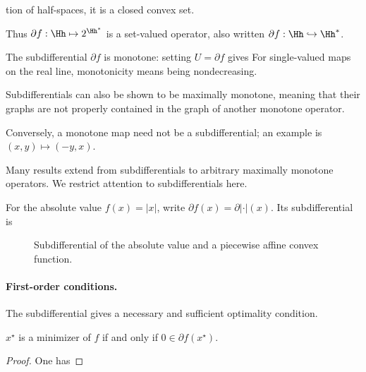 tion of half-spaces, it is a closed convex set.
                                                      
 
Thus $\partial f : \Hh \mapsto 2^{\Hh^*}$ is a set-valued operator, also written $\partial f : \Hh \hookrightarrow \Hh^*$.

\begin{rem}
The subdifferential $\partial f$ is monotone: setting $U=\partial f$ gives
For single-valued maps on the real line, monotonicity means being nondecreasing.
 
Subdifferentials can also be shown to be maximally monotone, meaning that their graphs are not properly contained in the graph of another monotone operator.
 
Conversely, a monotone map need not be a subdifferential; an example is $(x,y) \mapsto (-y,x)$.
  
Many results extend from subdifferentials to arbitrary maximally monotone operators. We restrict attention to subdifferentials here.
\end{rem}

For the absolute value $f(x)=|x|$, write $\partial f(x) = \partial |\cdot|(x)$. Its subdifferential is

\begin{figure}[tbp]
\centering
{}
\caption{Subdifferential of the absolute value and a piecewise affine convex function.}
\label{fig-subdiff-l1}
\end{figure}







   
\paragraph{First-order conditions.}

The subdifferential gives a necessary and sufficient optimality condition.

\begin{prop}
	$x^\star$ is a minimizer of $f$ if and only if $0 \in \partial f(x^\star)$.
\end{prop}
\begin{proof}
	One has
\end{proof}

